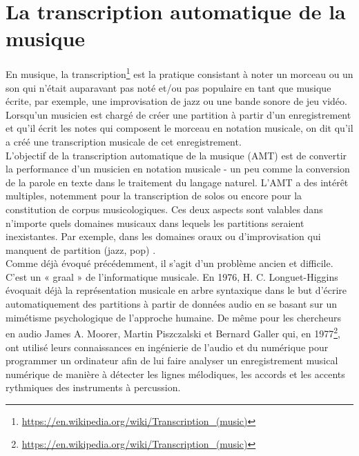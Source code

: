 \section{La transcription automatique de la musique}
En musique, la transcription\footnote{\url{https://en.wikipedia.org/wiki/Transcription_(music)}} est la pratique consistant à noter un morceau ou un son qui n'était auparavant pas noté et/ou pas populaire en tant que musique écrite, par exemple, une improvisation de jazz ou une bande sonore de jeu vidéo. Lorsqu'un musicien est chargé de créer une partition à partir d'un enregistrement et qu'il écrit les notes qui composent le morceau en notation musicale, on dit qu'il a créé une transcription musicale de cet enregistrement.\\
L'objectif de la transcription automatique de la musique (AMT) \cite{article1} est de convertir la performance d'un musicien en notation musicale - un peu comme la conversion de la parole en texte dans le traitement du langage naturel. L’AMT a des intérêt multiples, notemment pour la transcription de solos ou encore pour la constitution de corpus musicologiques. Ces deux aspects sont valables dans n’importe quels domaines musicaux dans lequels les partitions seraient inexistantes. Par exemple, dans les domaines oraux ou d’improvisation qui manquent de partition (jazz, pop) \cite{article1}.\\
Comme déjà évoqué précédemment, il s’agit d’un problème ancien et difficile. C’est un « graal » de l’informatique musicale. En 1976, H. C. Longuet-Higgins \cite{first_one} évoquait déjà la représentation musicale en arbre syntaxique dans le but d’écrire automatiquement des partitions à partir de données audio en se basant sur un mimétisme psychologique de l’approche humaine. De même pour les chercheurs en audio James A. Moorer, Martin Piszczalski et Bernard Galler qui, en 1977\footnote{\url{https://en.wikipedia.org/wiki/Transcription_(music)}}, ont utilisé leurs connaissances en ingénierie de l’audio et du numérique pour programmer un ordinateur afin de lui faire analyser un enregistrement musical numérique de manière à détecter les lignes mélodiques, les accords et les accents rythmiques des instruments à percussion.\\
